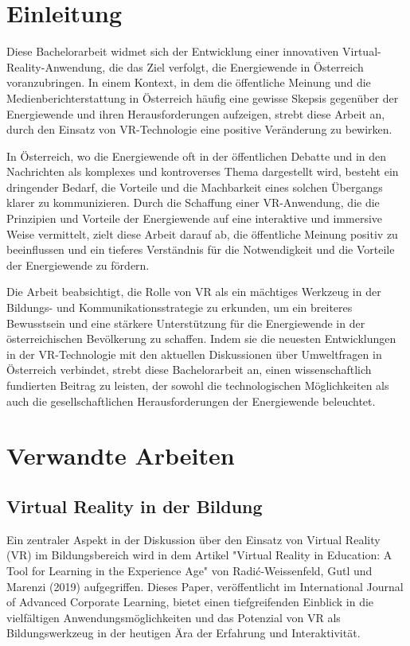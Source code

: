 \documentclass[draft,final]{vutinfth} %
\begin{document}
\chapter{Einleitung}
Diese Bachelorarbeit widmet sich der Entwicklung einer innovativen Virtual-Reality-Anwendung, die das Ziel verfolgt, die Energiewende in Österreich voranzubringen. In einem Kontext, in dem die öffentliche Meinung und die Medienberichterstattung in Österreich häufig eine gewisse Skepsis gegenüber der Energiewende und ihren Herausforderungen aufzeigen, strebt diese Arbeit an, durch den Einsatz von VR-Technologie eine positive Veränderung zu bewirken.

In Österreich, wo die Energiewende oft in der öffentlichen Debatte und in den Nachrichten als komplexes und kontroverses Thema dargestellt wird, besteht ein dringender Bedarf, die Vorteile und die Machbarkeit eines solchen Übergangs klarer zu kommunizieren. Durch die Schaffung einer VR-Anwendung, die die Prinzipien und Vorteile der Energiewende auf eine interaktive und immersive Weise vermittelt, zielt diese Arbeit darauf ab, die öffentliche Meinung positiv zu beeinflussen und ein tieferes Verständnis für die Notwendigkeit und die Vorteile der Energiewende zu fördern.

Die Arbeit beabsichtigt, die Rolle von VR als ein mächtiges Werkzeug in der Bildungs- und Kommunikationsstrategie zu erkunden, um ein breiteres Bewusstsein und eine stärkere Unterstützung für die Energiewende in der österreichischen Bevölkerung zu schaffen. Indem sie die neuesten Entwicklungen in der VR-Technologie mit den aktuellen Diskussionen über Umweltfragen in Österreich verbindet, strebt diese Bachelorarbeit an, einen wissenschaftlich fundierten Beitrag zu leisten, der sowohl die technologischen Möglichkeiten als auch die gesellschaftlichen Herausforderungen der Energiewende beleuchtet.

\chapter{Verwandte Arbeiten}

\section{Virtual Reality in der Bildung}

Ein zentraler Aspekt in der Diskussion über den Einsatz von Virtual Reality (VR) im Bildungsbereich wird in dem Artikel "Virtual Reality in Education: A Tool for Learning in the Experience Age" von Radić-Weissenfeld, Gutl und Marenzi (2019) aufgegriffen. Dieses Paper, veröffentlicht im International Journal of Advanced Corporate Learning, bietet einen tiefgreifenden Einblick in die vielfältigen Anwendungsmöglichkeiten und das Potenzial von VR als Bildungswerkzeug in der heutigen Ära der Erfahrung und Interaktivität.
\end{document}
